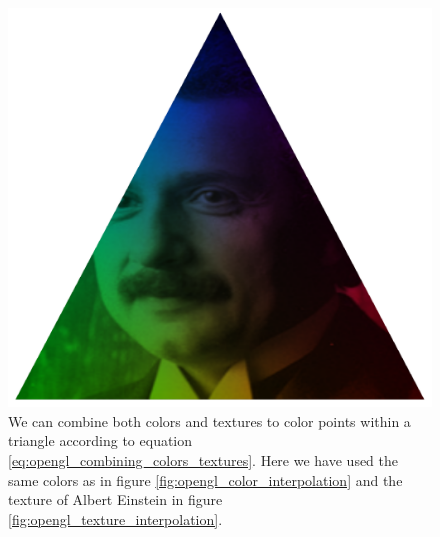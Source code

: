 \begin{figure}[h]
\begin{center}
\includegraphics[width=\textwidth, trim=0cm 0cm 0cm 0cm, clip]{opengl/figures/color_and_texture.png}
\end{center}
\caption{We can combine both colors and textures to color points within a triangle according to equation \eqref{eq:opengl_combining_colors_textures}. Here we have used the same colors as in figure \ref{fig:opengl_color_interpolation} and the texture of Albert Einstein in figure \ref{fig:opengl_texture_interpolation}.}
\label{fig:color_and_texture}
\end{figure}
